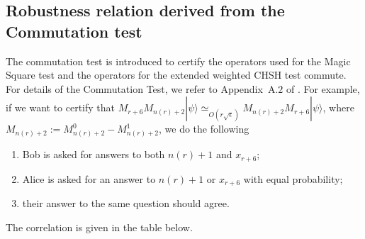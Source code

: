 \documentclass[11pt,letterpaper]{article}
\newcommand{\ket}[1]{|#1\rangle}
\newcommand{\1}{\mathbb{1}}
\newcommand{\nr}{n(r)}
\newcommand{\se}{\sqrt{\epsilon}}
\newcommand{\appd}[1]{\simeq_{#1}}
\theoremstyle{definition}
\begin{document}
\subsection{Robustness relation derived from the Commutation test}
\label{sec:comm_test}
The commutation test is introduced to certify the operators used for the Magic Square test and 
the operators for the extended weighted CHSH test commute. For details of the Commutation Test, 
we refer to Appendix~A.$2$ of \cite{coladan2017verifier}. 
For example, if we want to certify that $M_{r+6} M_{\nr+2}\ket{\psi} \appd{O(r\se)} M_{\nr+2} M_{r+6} \ket{\psi}$,
where $M_{\nr+2} := M_{\nr+2}^0 - M_{\nr+2}^1$,
we do the following
\begin{enumerate}
	\item Bob is asked for answers to both $\nr+1$ and $x_{r+6}$;
	\item Alice is asked for an answer to $\nr+1$ or $x_{r+6}$ with equal probability;
	\item their answer to the same question should agree.
\end{enumerate}
The correlation is given in the table below.
\end{document}
